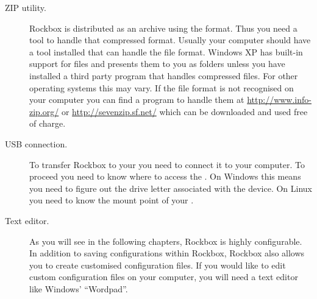 \begin{description}

\item[ZIP utility.]
  Rockbox is distributed as an archive using the
   format. Thus you need a tool to handle that compressed
  format. Usually your computer should have a tool installed that can
  handle the  file format. Windows XP has built-in support for
   files and presents them to you as folders unless you have
  installed a third party program that handles compressed files. For
  other operating systems this may vary. If the  file format
  is not recognised on your computer you can find a program to handle them
  at \url{http://www.info-zip.org/} or \url{http://sevenzip.sf.net/} which
  can be downloaded and used free of charge.

\item[USB connection.]  To transfer Rockbox to your \dap{} you need to
  connect it to your computer. To proceed you need to know where to access the
  \dap{}. On Windows this means you need to figure out the drive letter
  associated with the device. On Linux you need to know the mount point of
  your \dap{}.

         
    
\item[Text editor.]  As you will see in the following chapters, Rockbox is
  highly configurable. In addition to saving configurations within Rockbox,
  Rockbox also allows you to create customised configuration files. If you
  would like to edit custom configuration files on your computer, you will
  need a text editor like Windows' ``Wordpad''.

\end{description}

